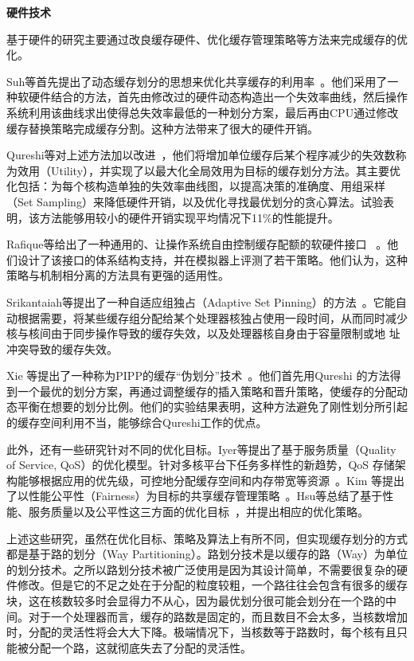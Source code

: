 \textbf{硬件技术}

基于硬件的研究主要通过改良缓存硬件、优化缓存管理策略等方法来完成缓存的优化。

Suh等首先提出了动态缓存划分的思想来优化共享缓存的利用率~\parencite{suh2002new,suh2004dynamic,suh2014analytical}。他们采用了一种软硬件结合的方法，首先由修改过的硬件动态构造出一个失效率曲线，然后操作系统利用该曲线求出使得总失效率最低的一种划分方案，最后再由CPU通过修改缓存替换策略完成缓存分割。这种方法带来了很大的硬件开销。

Qureshi等对上述方法加以改进~\parencite{qureshi2006utility,qureshi2007adaptive}，他们将增加单位缓存后某个程序减少的失效数称为效用（Utility），并实现了以最大化全局效用为目标的缓存划分方法。其主要优化包括：为每个核构造单独的失效率曲线图，以提高决策的准确度、用组采样（Set Sampling）来降低硬件开销，以及优化寻找最优划分的贪心算法。试验表明，该方法能够用较小的硬件开销实现平均情况下11\%的性能提升。

Rafique等给出了一种通用的、让操作系统自由控制缓存配额的软硬件接口
~\parencite{rafique2006architectural}。他们设计了该接口的体系结构支持，并在模拟器上评测了若干策略。他们认为，这种策略与机制相分离的方法具有更强的适用性。

Srikantaiah等提出了一种自适应组独占（Adaptive Set Pinning）的方法~\parencite{srikantaiah2009sharp}。它能自动根据需要，将某些缓存组分配给某个处理器核独占使用一段时间，从而同时减少核与核间由于同步操作导致的缓存失效，以及处理器核自身由于容量限制或地
址冲突导致的缓存失效。

Xie 等提出了一种称为PIPP的缓存“伪划分”技术~\parencite{xie2009pipp}。他们首先用Qureshi 的方法得到一个最优的划分方案，再通过调整缓存的插入策略和晋升策略，使缓存的分配动态平衡在想要的划分比例。他们的实验结果表明，这种方法避免了刚性划分所引起的缓存空间利用不当，能够综合Qureshi工作的优点。

此外，还有一些研究针对不同的优化目标。Iyer等提出了基于服务质量（Quality of Service, QoS）的优化模型。针对多核平台下任务多样性的新趋势，QoS 存储架构能够根据应用的优先级，可控地分配缓存空间和内存带宽等资源~\parencite{iyer2004cqos}。Kim 等提出了以性能公平性（Fairness）为目标的共享缓存管理策略~\parencite{kim2004fair}。Hsu等总结了基于性能、服务质量以及公平性这三方面的优化目标~\parencite{hsu2006communist}，并提出相应的优化策略。

上述这些研究，虽然在优化目标、策略及算法上有所不同，但实现缓存划分的方式都是基于路的划分（Way Partitioning）。路划分技术是以缓存的路（Way）为单位的划分技术。之所以路划分技术被广泛使用是因为其设计简单，不需要很复杂的硬件修改。但是它的不足之处在于分配的粒度较粗，一个路往往会包含有很多的缓存块，这在核数较多时会显得力不从心，因为最优划分很可能会划分在一个路的中间。对于一个处理器而言，缓存的路数是固定的，而且数目不会太多，当核数增加时，分配的灵活性将会大大下降。极端情况下，当核数等于路数时，每个核有且只能被分配一个路，这就彻底失去了分配的灵活性。

